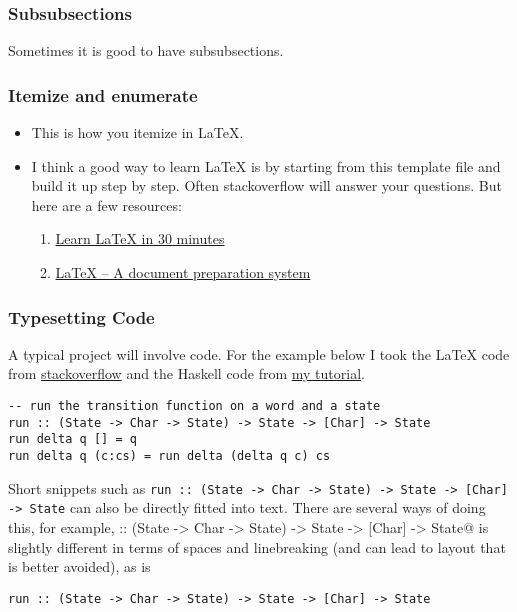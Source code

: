 \documentclass{article}
\theoremstyle{theorem}
\theoremstyle{definition}
\theoremstyle{remark}
\begin{document}
\subsubsection{Subsubsections}

Sometimes it is good to have subsubsections.

\subsubsection{Itemize and enumerate}

\begin{itemize}
\item This is how you itemize in LaTeX.
\item I think a good way to learn LaTeX is by starting from this template file and build it up step by step. Often stackoverflow will answer your questions. But here are a few resources:
  \begin{enumerate}
  \item \href{https://www.overleaf.com/learn/latex/Learn_LaTeX_in_30_minutes}{Learn LaTeX in 30 minutes}
  \item \href{https://www.latex-project.org/}{LaTeX – A document preparation system}\end{enumerate}
\end{itemize}

\subsubsection{Typesetting Code}

A typical project will involve code. For the example below I took the LaTeX code from \href{https://stackoverflow.com/a/3175141/4600290}{stackoverflow} and the Haskell code from \href{https://hackmd.io/@alexhkurz/HylLKujCP}{my tutorial}.

\begin{lstlisting}
-- run the transition function on a word and a state
run :: (State -> Char -> State) -> State -> [Char] -> State
run delta q [] = q
run delta q (c:cs) = run delta (delta q c) cs 
\end{lstlisting}
%
Short snippets such as \texttt{run :: (State -> Char -> State) -> State -> [Char] -> State} can also be directly fitted into text. There are several ways of doing this, for example, \verb@run :: (State -> Char -> State) -> State -> [Char] -> State@ is slightly different in terms of spaces and linebreaking (and can lead to layout that is better avoided), as is
\begin{verbatim}run :: (State -> Char -> State) -> State -> [Char] -> State\end{verbatim}
\end{document}
